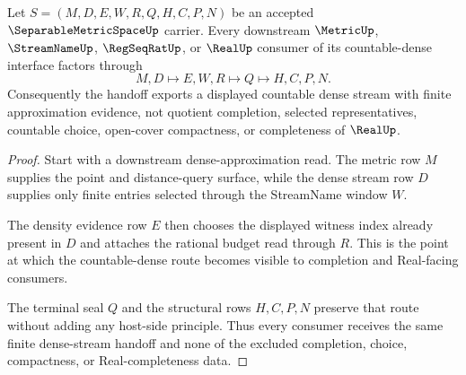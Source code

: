 \begin{theorem}
\label{thm:separable-metric-space-countable-dense-stream-handoff}
Let $S=(M,D,E,W,R,Q,H,C,P,N)$ be an accepted $\SeparableMetricSpaceUp$ carrier. Every downstream $\MetricUp$, $\StreamNameUp$, $\RegSeqRatUp$, or $\RealUp$ consumer of its countable-dense interface factors through
$$
M,D \longmapsto E,W,R \longmapsto Q \longmapsto H,C,P,N .
$$
Consequently the handoff exports a displayed countable dense stream with finite approximation evidence, not quotient completion, selected representatives, countable choice, open-cover compactness, or completeness of $\RealUp$.
\end{theorem}
\begin{proof}
Start with a downstream dense-approximation read. The metric row $M$ supplies the point and distance-query surface, while the dense stream row $D$ supplies only finite entries selected through the StreamName window $W$.

The density evidence row $E$ then chooses the displayed witness index already present in $D$ and attaches the rational budget read through $R$. This is the point at which the countable-dense route becomes visible to completion and Real-facing consumers.

The terminal seal $Q$ and the structural rows $H,C,P,N$ preserve that route without adding any host-side principle. Thus every consumer receives the same finite dense-stream handoff and none of the excluded completion, choice, compactness, or Real-completeness data.
\end{proof}


\begin{closurestatus}{\SeparableMetricSpaceUp}
  \theoryclosure{\seedClosure}
  \formalstatus{\unformalizedV}
\end{closurestatus}

